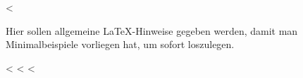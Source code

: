 \documentclass[
  numbers=autoendperiod,
  a4paper,  %
  twoside,  %
  bibliography=totoc,
  headsepline,
  cleardoublepage=empty,
  parskip=half,
  draft=false
]{scrbook}
\begin{document}
<%
\label{chap:latexhints}

Hier sollen allgemeine \LaTeX-Hinweise gegeben werden, damit man Minimalbeispiele vorliegen hat, um sofort loszulegen.

<%
<%
<%
\end{document}
